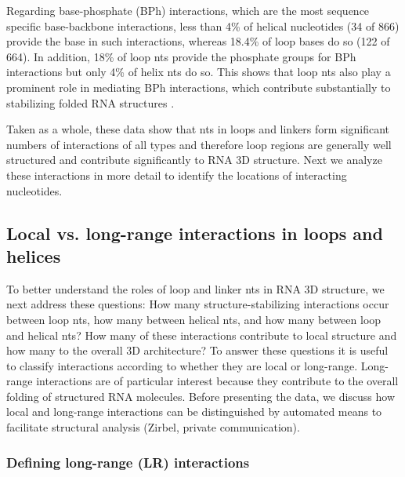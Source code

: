 Regarding base-phosphate (BPh) interactions, which are the most sequence
specific base-backbone interactions, less than 4\% of helical nucleotides (34 of
866) provide the base in such interactions, whereas 18.4\% of loop bases do so
(122 of 664). In addition, 18\% of loop nts provide the phosphate groups for BPh
interactions but only 4\% of helix nts do so. This shows that loop nts also play
a prominent role in mediating BPh interactions, which contribute substantially
to stabilizing folded RNA structures \cite{Zirbel2009, Sponer2010}. 

Taken as a whole, these data show that nts in loops and linkers form significant
numbers of interactions of all types and therefore loop regions are generally
well structured and contribute significantly to RNA 3D structure. Next we
analyze these interactions in more detail to identify the locations of
interacting nucleotides. 

\subsection{Local vs. long-range interactions in loops and helices}

To better understand the roles of loop and linker nts in RNA 3D structure, we
next address these questions: How many structure-stabilizing interactions occur
between loop nts, how many between helical nts, and how many between loop and
helical nts? How many of these interactions contribute to local structure and
how many to the overall 3D architecture? To answer these questions it is useful
to classify interactions according to whether they are local or long-range.
Long-range interactions are of particular interest because they contribute to
the overall folding of structured RNA molecules. Before presenting the data, we
discuss how local and long-range interactions can be distinguished by automated
means to facilitate structural analysis (Zirbel, private communication). 

\subsubsection{Defining long-range (LR) interactions}

